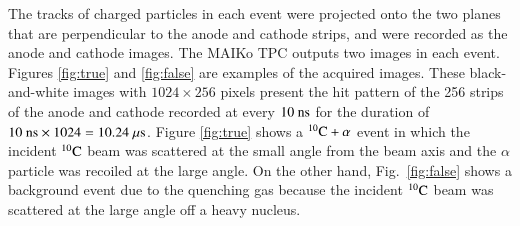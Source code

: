 \documentclass{jps-cp}
\begin{document}
The tracks of charged particles in each event were projected onto the two planes that are perpendicular to the anode and cathode strips, and were recorded as the anode and cathode images.
The MAIKo TPC outputs two images in each event.
Figures \ref{fig:true} and \ref{fig:false} are examples of the acquired images.
These black-and-white images with $1024\times 256$ pixels present the hit pattern of the 256 strips of the anode and cathode recorded
at every $10~\rm{ns}$ for the duration of $10~\rm{ns}\times 1024 = 10.24~\rm{\mu s}$.
Figure \ref{fig:true} shows a ${}^{10}\rm{C}+\alpha$ event
in which the incident ${}^{10}\rm{C}$ beam was scattered at the small angle from the beam axis and the $\alpha$ particle was
recoiled at the large angle.
On the other hand, Fig.~\ref{fig:false} shows a background event due to the quenching gas
because the incident ${}^{10}\rm{C}$ beam was scattered at the large angle off a heavy nucleus.
\end{document}
